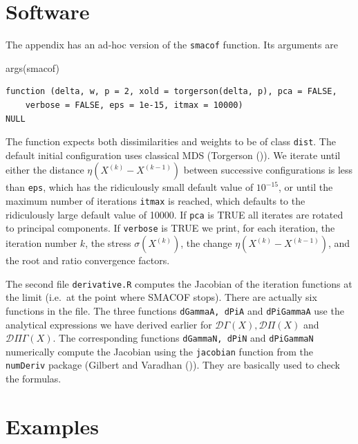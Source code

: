 \documentclass[
  12pt,
  letterpaper,
  DIV=11,
  numbers=noendperiod]{scrartcl}
\newenvironment{Shaded}{\begin{snugshade}}{\end{snugshade}}
\newcommand{\FunctionTok}[1]{\textcolor[rgb]{0.28,0.35,0.67}{#1}}
\newcommand{\NormalTok}[1]{\textcolor[rgb]{0.00,0.23,0.31}{#1}}
\begin{document}
\section{Software}\label{software}

The appendix has an ad-hoc version of the \texttt{smacof} function. Its
arguments are

\begin{Shaded}
\begin{Highlighting}[]
\FunctionTok{args}\NormalTok{(smacof)}
\end{Highlighting}
\end{Shaded}

\begin{verbatim}
function (delta, w, p = 2, xold = torgerson(delta, p), pca = FALSE, 
    verbose = FALSE, eps = 1e-15, itmax = 10000) 
NULL
\end{verbatim}

The function expects both dissimilarities and weights to be of class
\texttt{dist}. The default initial configuration uses classical MDS
(Torgerson ()). We iterate until either
the distance \(\eta(X^{(k)}-X^{(k-1)})\) between successive
configurations is less than \texttt{eps}, which has the ridiculously
small default value of \ensuremath{10^{-15}}, or until the maximum
number of iterations \texttt{itmax} is reached, which defaults to the
ridiculously large default value of 10000. If \texttt{pca} is TRUE all
iterates are rotated to principal components. If \texttt{verbose} is
TRUE we print, for each iteration, the iteration number \(k\), the
stress \(\sigma(X^{(k)})\), the change \(\eta(X^{(k)}-X^{(k-1)})\), and
the root and ratio convergence factors.

The second file \texttt{derivative.R} computes the Jacobian of the
iteration functions at the limit (i.e.~at the point where SMACOF stops).
There are actually six functions in the file. The three functions
\texttt{dGammaA,\ dPiA} and \texttt{dPiGammaA} use the analytical
expressions we have derived earlier for
\(\mathcal{D}\Gamma(X), \mathcal{D}\Pi(X)\) and
\(\mathcal{D}\Pi\Gamma(X).\) The corresponding functions
\texttt{dGammaN,\ dPiN} and \texttt{dPiGammaN} numerically compute the
Jacobian using the \texttt{jacobian} function from the \texttt{numDeriv}
package (Gilbert and Varadhan
()). They are basically used to
check the formulas.

\section{Examples}\label{examples}
\end{document}
